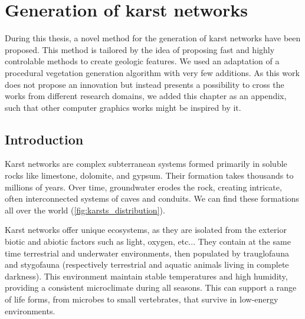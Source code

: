 \graphicspath{{"./Chapter 2/Karsts/"}}

\chapter{Generation of karst networks}
\label{chap:karsts}


\abstract
During this thesis, a novel method for the generation of karst networks have been proposed. This method is tailored by the idea of proposing fast and highly controlable methods to create geologic features. We used an adaptation of a procedural vegetation generation algorithm with very few additions. As this work does not propose an innovation but instead presents a possibility to cross the works from different research domains, we added this chapter as an appendix, such that other computer graphics works might be inspired by it.


\minitoc

\section{Introduction}
\label{sec:karst_introduction}
Karst networks are complex subterranean systems formed primarily in soluble rocks like limestone, dolomite, and gypsum. Their formation takes thousands to millions of years. Over time, groundwater erodes the rock, creating intricate, often interconnected systems of caves and conduits. We can find these formations all over the world (\cref{fig:karsts_distribution}).

Karst networks offer unique ecosystems, as they are isolated from the exterior biotic and abiotic factors such as light, oxygen, etc... They contain at the same time terrestrial and underwater environments, then populated by trauglofauna and stygofauna (respectively terrestrial and aquatic animals living in complete darkness). This environment maintain stable temperatures and high humidity, providing a consistent microclimate during all seasons. This can support a range of life forms, from microbes to small vertebrates, that survive in low-energy environments.

